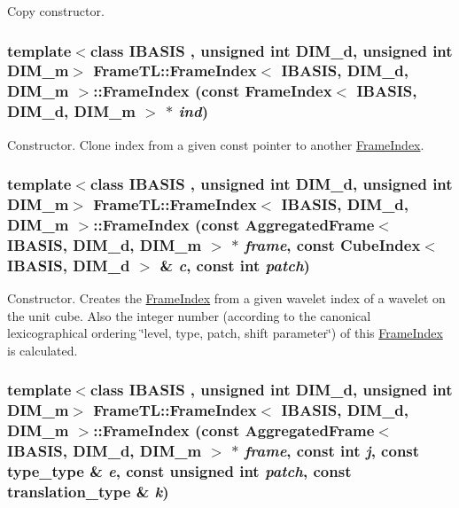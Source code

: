 Copy constructor. \hypertarget{classFrameTL_1_1FrameIndex_2300543ef2fc0fa938f2d8bb53902092}{
\subsubsection[{FrameIndex}]{\setlength{\rightskip}{0pt plus 5cm}template$<$class IBASIS , unsigned int DIM\_\-d, unsigned int DIM\_\-m$>$ {\bf FrameTL::FrameIndex}$<$ IBASIS, DIM\_\-d, DIM\_\-m $>$::{\bf FrameIndex} (const {\bf FrameIndex}$<$ IBASIS, DIM\_\-d, DIM\_\-m $>$ $\ast$ {\em ind})}}
\label{classFrameTL_1_1FrameIndex_2300543ef2fc0fa938f2d8bb53902092}


Constructor. Clone index from a given const pointer to another \hyperlink{classFrameTL_1_1FrameIndex}{FrameIndex}. \hypertarget{classFrameTL_1_1FrameIndex_38bc47d11409b690b23e93d616e1ca02}{
\subsubsection[{FrameIndex}]{\setlength{\rightskip}{0pt plus 5cm}template$<$class IBASIS , unsigned int DIM\_\-d, unsigned int DIM\_\-m$>$ {\bf FrameTL::FrameIndex}$<$ IBASIS, DIM\_\-d, DIM\_\-m $>$::{\bf FrameIndex} (const {\bf AggregatedFrame}$<$ IBASIS, DIM\_\-d, DIM\_\-m $>$ $\ast$ {\em frame}, \/  const CubeIndex$<$ IBASIS, DIM\_\-d $>$ \& {\em c}, \/  const int {\em patch})}}
\label{classFrameTL_1_1FrameIndex_38bc47d11409b690b23e93d616e1ca02}


Constructor. Creates the \hyperlink{classFrameTL_1_1FrameIndex}{FrameIndex} from a given wavelet index of a wavelet on the unit cube. Also the integer number (according to the canonical lexicographical ordering \char`\"{}level, type, patch, shift parameter\char`\"{}) of this \hyperlink{classFrameTL_1_1FrameIndex}{FrameIndex} is calculated. \hypertarget{classFrameTL_1_1FrameIndex_f911f080552f2b21b77625929003b514}{
\subsubsection[{FrameIndex}]{\setlength{\rightskip}{0pt plus 5cm}template$<$class IBASIS , unsigned int DIM\_\-d, unsigned int DIM\_\-m$>$ {\bf FrameTL::FrameIndex}$<$ IBASIS, DIM\_\-d, DIM\_\-m $>$::{\bf FrameIndex} (const {\bf AggregatedFrame}$<$ IBASIS, DIM\_\-d, DIM\_\-m $>$ $\ast$ {\em frame}, \/  const int {\em j}, \/  const {\bf type\_\-type} \& {\em e}, \/  const unsigned int {\em patch}, \/  const {\bf translation\_\-type} \& {\em k})}}
\label{classFrameTL_1_1FrameIndex_f911f080552f2b21b77625929003b514}


